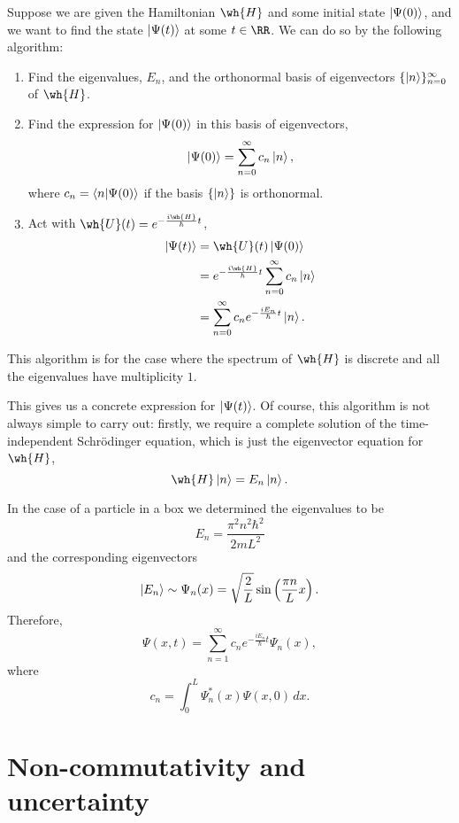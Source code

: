 \documentclass[12pt, a4paper]{article}
\begin{document}
Suppose we are given the Hamiltonian \(\wh{H}\) and some initial state \(\ket{\Psi(0)}\), and we want to find the state \(\ket{\Psi(t)}\) at some \(t \in \RR\). We can do so by the following algorithm:
\begin{enumerate}
    \item Find the eigenvalues, \(E_n\), and the orthonormal basis of eigenvectors \(\{\ket{n}\}_{n=0}^{\infty}\) of \(\wh{H}\).
    \item Find the expression for \(\ket{\Psi(0)}\) in this basis of eigenvectors,
    \[\ket{\Psi(0)} = \sum_{n=0}^{\infty} c_n \ket{n},\]
    where \(c_n = \bra{n}\ket{\Psi(0)}\) if the basis \(\{\ket{n}\}\) is orthonormal.
    \item Act with \(\wh{U}(t)=e^{-\frac{i\wh{H}}{\hbar}t}\),
    \[\begin{aligned}
        \ket{\Psi(t)} &= \wh{U}(t) \ket{\Psi(0)} \\
        &= e^{-\frac{i\wh{H}}{\hbar}t}\sum_{n=0}^{\infty} c_n \ket{n} \\
        &= \sum_{n=0}^{\infty} c_n e^{-\frac{i E_n}{\hbar}t} \ket{n}.
    \end{aligned}\]
\end{enumerate}

\begin{mdremark}
    This algorithm is for the case where the spectrum of \(\wh{H}\) is discrete and all the eigenvalues have multiplicity \(1\).
\end{mdremark}

This gives us a concrete expression for \(\ket{\Psi(t)}\). Of course, this algorithm is not always simple to carry out: firstly, we require a complete solution of the time-independent Schrödinger equation, which is just the eigenvector equation for \(\wh{H}\),
\[\wh{H} \ket{n} = E_n \ket{n}.\]

\begin{example}
    In the case of a particle in a box we determined the eigenvalues to be 
    \[E_n = \frac{\pi^2 n^2 \hbar^2}{2mL^2}\]
    and the corresponding eigenvectors 
    \[\ket{E_n} \sim \Psi_n(x) = \sqrt{\frac{2}{L}} \sin\left( \frac{\pi n}{L}x \right).\]
    Therefore, 
    \[\Psi(x,t) = \sum_{n=1}^{\infty} c_n e^{-\frac{iE_n}{\hbar}t} \Psi_n(x),\]
    where 
    \[c_n = \int_{0}^L \Psi^*_n(x)\Psi(x,0) \, dx.\]
\end{example}

\section{Non-commutativity and uncertainty}
\end{document}
